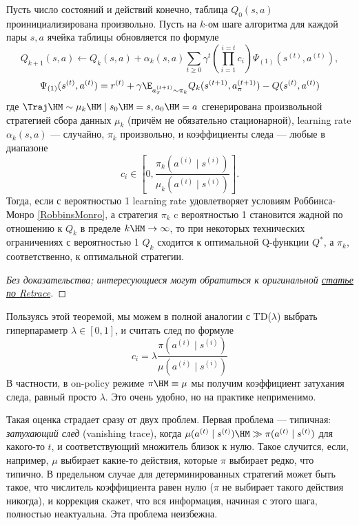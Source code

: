 \begin{theorem}[Retrace]
Пусть число состояний и действий конечно, таблица $Q_0(s, a)$ проинициализирована произвольно. Пусть на $k$-ом шаге алгоритма для каждой пары $s, a$ ячейка таблицы обновляется по формуле
$$Q_{k+1}(s, a) \leftarrow Q_k(s, a) + \alpha_k(s, a)
\sum_{t \ge 0} \gamma^t \left( \prod_{i = 1}^{i = t}  c_{i} \right) \Psi_{(1)}(s^{(t)}, a^{(t)}),$$
$$\Psi_{(1)}(s^{(t)}, a^{(t)}) = r^{(t)} + \gamma \E_{a^{(t+1)}_\pi \sim \pi_k} Q_k(s^{(t+1)}, a^{(t+1)}_\pi) - Q(s^{(t)}, a^{(t)})$$
где $\Traj \HM\sim \mu_k \HM\mid s_0 \HM= s, a_0 \HM= a$ сгенерирована произвольной стратегией сбора данных $\mu_k$ (причём не обязательно стационарной), learning rate $\alpha_k(s, a)$ --- случайно, $\pi_k$ произвольно, и коэффициенты следа --- любые в диапазоне
$$c_i \in \left[ 0, \frac{\pi_k(a^{(i)} \mid s^{(i)}) }{\mu_k(a^{(i)} \mid s^{(i)})} \right].$$
Тогда, если с вероятностью 1 learning rate удовлетворяет условиям Роббинса-Монро \eqref{RobbinsMonro}, а стратегия $\pi_k$ c вероятностью 1 становится жадной по отношению к $Q_k$ в пределе $k \HM\to \infty$, то при некоторых технических ограничениях с вероятностью 1 $Q_k$ сходится к оптимальной Q-функции $Q^*$, а $\pi_k$, соответственно, к оптимальной стратегии.
\begin{proof}[Без доказательства; интересующиеся могут обратиться к оригинальной \href{https://arxiv.org/abs/1606.02647}{статье по Retrace}]
\end{proof}
\end{theorem}

Пользуясь этой теоремой, мы можем в полной аналогии с TD($\lambda$) выбрать гиперпараметр $\lambda \in [0, 1]$, и считать след по формуле
$$
    c_i = \lambda \frac{\pi(a^{(i)} \mid s^{(i)}) }{\mu(a^{(i)} \mid s^{(i)})}
$$
В частности, в on-policy режиме $\pi \HM \equiv \mu$ мы получим коэффициент затухания следа, равный просто $\lambda$. Это очень удобно, но на практике неприменимо.

Такая оценка страдает сразу от двух проблем. Первая проблема --- типичная: \emph{затухающий след} (vanishing trace), когда $\mu(a^{(t)} \mid s^{(t)}) \HM\gg \pi(a^{(t)} \mid s^{(t)})$ для какого-то $t$, и соответствующий множитель близок к нулю. Такое случится, если, например, $\mu$ выбирает какие-то действия, которые $\pi$ выбирает редко, что типично. В предельном случае для детерминированных стратегий может быть такое, что числитель коэффициента равен нулю ($\pi$ не выбирает такого действия никогда), и коррекция скажет, что вся информация, начиная с этого шага, полностью неактуальна. Эта проблема неизбежна.

